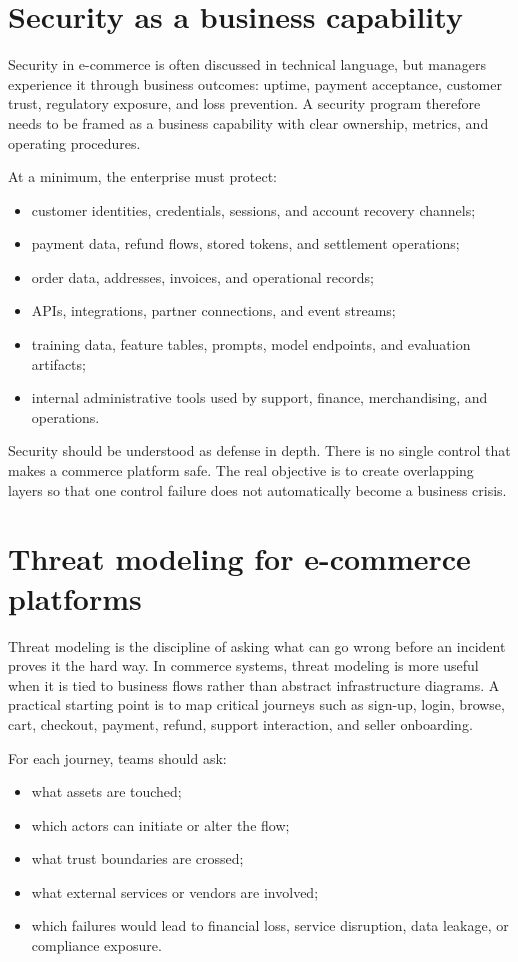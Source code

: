 \section{Security as a business capability}
Security in e-commerce is often discussed in technical language, but managers experience it through business outcomes: uptime, payment acceptance, customer trust, regulatory exposure, and loss prevention. A security program therefore needs to be framed as a business capability with clear ownership, metrics, and operating procedures.

At a minimum, the enterprise must protect:
\begin{itemize}
  \item customer identities, credentials, sessions, and account recovery channels;
  \item payment data, refund flows, stored tokens, and settlement operations;
  \item order data, addresses, invoices, and operational records;
  \item APIs, integrations, partner connections, and event streams;
  \item training data, feature tables, prompts, model endpoints, and evaluation artifacts;
  \item internal administrative tools used by support, finance, merchandising, and operations.
\end{itemize}

Security should be understood as defense in depth. There is no single control that makes a commerce platform safe. The real objective is to create overlapping layers so that one control failure does not automatically become a business crisis.

\section{Threat modeling for e-commerce platforms}
Threat modeling is the discipline of asking what can go wrong before an incident proves it the hard way. In commerce systems, threat modeling is more useful when it is tied to business flows rather than abstract infrastructure diagrams. A practical starting point is to map critical journeys such as sign-up, login, browse, cart, checkout, payment, refund, support interaction, and seller onboarding.

For each journey, teams should ask:
\begin{itemize}
  \item what assets are touched;
  \item which actors can initiate or alter the flow;
  \item what trust boundaries are crossed;
  \item what external services or vendors are involved;
  \item which failures would lead to financial loss, service disruption, data leakage, or compliance exposure.
\end{itemize}


